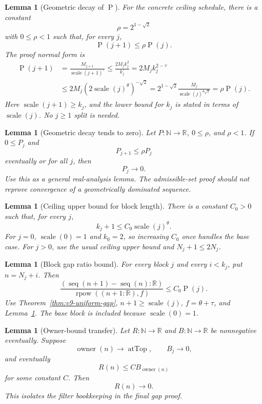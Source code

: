 \documentclass[11pt]{article}
\theoremstyle{definition}
\theoremstyle{plain}
\newtheorem{lemma}[definition]{Lemma}
\theoremstyle{remark}
\newcommand{\N}{\mathbb{N}}
\newcommand{\R}{\mathbb{R}}
\newcommand{\owner}{\operatorname{owner}}
\newcommand{\seq}{\operatorname{seq}}
\newcommand{\thetaC}{\theta}
\newcommand{\tauC}{\tau}
\newcommand{\fexp}{f}
\newcommand{\rpow}{\operatorname{rpow}}
\newcommand{\atTop}{\operatorname{atTop}}
\newcommand{\Pfun}{\operatorname{P}}
\newcommand{\Scale}{\operatorname{scale}}
\begin{document}
\begin{lemma}[Geometric decay of \(\Pfun\)]\label{lem:v9-P-geometric}
For the concrete ceiling schedule, there is a constant
\[
        \rho=2^{1-\sqrt2}
\]
with \(0\le\rho<1\) such that, for every \(j\),
\[
        \Pfun(j+1)\le \rho \Pfun(j).
\]
The proof normal form is
\[
\begin{aligned}
\Pfun(j+1)
&=\frac{M_{j+1}}{\Scale(j+1)^{\tauC}}
\le \frac{2M_jk_j^2}{k_j^{\tauC}}
=2M_jk_j^{2-\tauC} \\
&\le 2M_j(2\Scale(j)^{\thetaC})^{-\sqrt2}
=2^{1-\sqrt2}\frac{M_j}{\Scale(j)^{\thetaC\sqrt2}}
=\rho \Pfun(j).
\end{aligned}
\]
Here \(\Scale(j+1)\ge k_j\), and the lower bound for \(k_j\) is stated in terms of \(\Scale(j)\).  No \(j\ge1\) split is needed.
\end{lemma}

\begin{lemma}[Geometric decay tends to zero]\label{lem:v9-geom-to-zero}
Let \(P:\N\to\R\), \(0\le\rho\), and \(\rho<1\).  If \(0\le P_j\) and
\[
        P_{j+1}\le\rho P_j
\]
eventually or for all \(j\), then
\[
        P_j\to0.
\]
Use this as a general real-analysis lemma.  The admissible-set proof should not reprove convergence of a geometrically dominated sequence.
\end{lemma}

\begin{lemma}[Ceiling upper bound for block length]\label{lem:v9-k-upper}
There is a constant \(C_0>0\) such that, for every \(j\),
\[
        k_j+1\le C_0\Scale(j)^{\thetaC}.
\]
For \(j=0\), \(\Scale(0)=1\) and \(k_0=2\), so increasing \(C_0\) once handles the base case.  For \(j>0\), use the usual ceiling upper bound and \(N_j+1\le2N_j\).
\end{lemma}

\begin{lemma}[Block gap ratio bound]\label{lem:v9-block-gap-ratio}
For every block \(j\) and every \(i<k_j\), put \(n=N_j+i\).  Then
\[
        \frac{(\seq(n+1)-\seq(n):\R)}{\rpow((n+1:\R),\fexp)}
        \le C_0 \Pfun(j).
\]
Use Theorem~\ref{thm:v9-uniform-gap}, \(n+1\ge \Scale(j)\), \(\fexp=\thetaC+\tauC\), and Lemma~\ref{lem:v9-k-upper}.  The base block is included because \(\Scale(0)=1\).
\end{lemma}

\begin{lemma}[Owner-bound transfer]\label{lem:v9-owner-bound-transfer}
Let \(R:\N\to\R\) and \(B:\N\to\R\) be nonnegative eventually.  Suppose
\[
        \owner(n)\to\atTop,
        \qquad
        B_j\to0,
\]
and eventually
\[
        R(n)\le C B_{\owner(n)}
\]
for some constant \(C\).  Then
\[
        R(n)\to0.
\]
This isolates the filter bookkeeping in the final gap proof.
\end{lemma}
\end{document}
